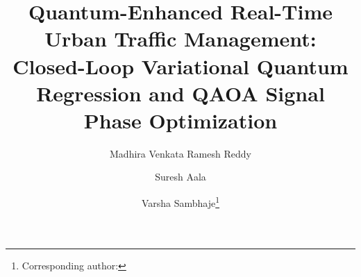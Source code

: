 \documentclass{llncs}
\begin{document}

\title{Quantum-Enhanced Real-Time Urban Traffic Management: Closed-Loop Variational Quantum Regression and QAOA Signal Phase Optimization}

\author{Madhira Venkata Ramesh Reddy \and
Suresh Aala \and
Varsha Sambhaje\thanks{Corresponding author: }}


\maketitle
\end{document}
